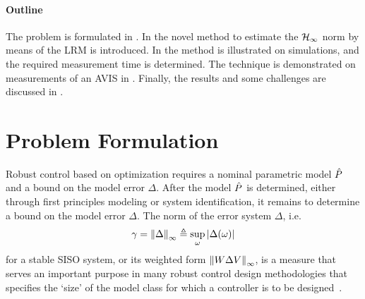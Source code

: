 \vspace{-1em}
\paragraph*{Outline}
\label{par:toc}
The problem is formulated in .
In  the novel method to estimate the $\mathcal{H}_{\infty}{}$ norm by means of the \gls{LRM} is introduced.
In  the method is illustrated on simulations, and the required measurement time is determined.
The technique is demonstrated on measurements of an \gls{AVIS} in .
Finally, the results and some challenges are discussed in .

\glsresetall %

\section{Problem Formulation}
\label{sec:Problem}
Robust control based on \Hinf{} optimization requires a nominal parametric model $\hat{P}$ and a bound on the model error $\Delta$. 
After the model $\hat{P}$ is determined, either through first principles modeling or system identification, it remains to determine a bound on the model error $\Delta$.
The \Hinf{} norm of the error system $\Delta$, i.e.
\begin{equation}
  \gamma 
     = 
       \left\| \Delta \right\|_{\infty} 
    \triangleq 
       \sup_{\omega} 
         \left| \Delta(\omega) \right|
  \label{eq:HinfNormSISO}
\end{equation}
for a stable \gls{SISO} system, or its weighted form $\left\| W \Delta V \right\|_{\infty}$, is a measure that serves an important purpose in many robust control design methodologies that specifies the `size' of the model class for which a controller is to be designed~\citep{Skogestad2005}.

